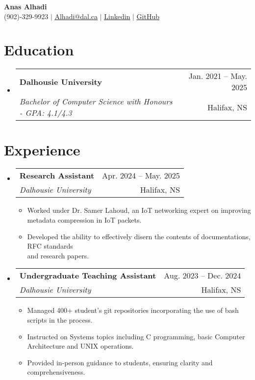 \documentclass[letterpaper,11pt]{article}
\makeatletter
\newcommand{\resumeItem}[1]{
  \item\small{
    {#1 \vspace{-2pt}}
  }
}
\newcommand{\resumeSubheading}[4]{
  \vspace{-2pt}\item
    \begin{tabular*}{0.97\textwidth}[t]{l@{\extracolsep{\fill}}r}
      \textbf{#1} & #2 \\
			\textit{\small#3} & \small #4 \\
    \end{tabular*}\vspace{-7pt}
}
\newcommand{\resumeSubHeadingListStart}{\begin{itemize}[leftmargin=0.15in, label={}]}
\newcommand{\resumeSubHeadingListEnd}{\end{itemize}}
\newcommand{\resumeItemListStart}{\begin{itemize}}
\newcommand{\resumeItemListEnd}{\end{itemize}\vspace{-5pt}}
\makeatother
\begin{document}

\begin{center}
    \textbf{\Huge Anas Alhadi} \\ \vspace{1pt}
		\small (902)-329-9923 $|$ \label{contact_info}\href{mailto:Alhadi@dal.ca}{\underline{Alhadi@dal.ca}} $|$ 
    \href{https://linkedin.com/in/anas-alhadi}{\underline{Linkedin}}
$|$ 
    \href{https://github.com/pthread-me}{\underline{GitHub}}
    
\end{center}


\section{Education}
  \resumeSubHeadingListStart
    \resumeSubheading
      {Dalhousie University}{Jan. 2021 -- May. 2025}
      {Bachelor of Computer Science with Honours - GPA: 4.1/4.3}
      {Halifax, NS}
    
  \resumeSubHeadingListEnd


\section{Experience}
  \resumeSubHeadingListStart

	\resumeSubheading
      {Research Assistant}{Apr. 2024 -- May. 2025  }
      {Dalhousie University}{Halifax, NS}
      \resumeItemListStart
        \resumeItem{Worked under Dr. Samer Lahoud, an IoT networking expert on improving\\ metadata compression in IoT packets.}
        \resumeItem{Developed the ability to effectively disern the contents of documentations, RFC standards\\ and research papers.}
      \resumeItemListEnd 


  \resumeSubheading
		{Undergraduate Teaching Assistant}{Aug. 2023 -- Dec. 2024 }
      {Dalhousie University}{Halifax, NS}
      \resumeItemListStart
        \resumeItem{Managed 400+ student's git repositories incorporating the use of bash scripts in the process.}
        \resumeItem{Instructed on Systems topics including  C programming, basic Computer Architecture and UNIX operations.}
        \resumeItem{Provided in-person guidance to students, ensuring clarity and comprehensiveness.}
      \resumeItemListEnd 
  \resumeSubHeadingListEnd
\end{document}
